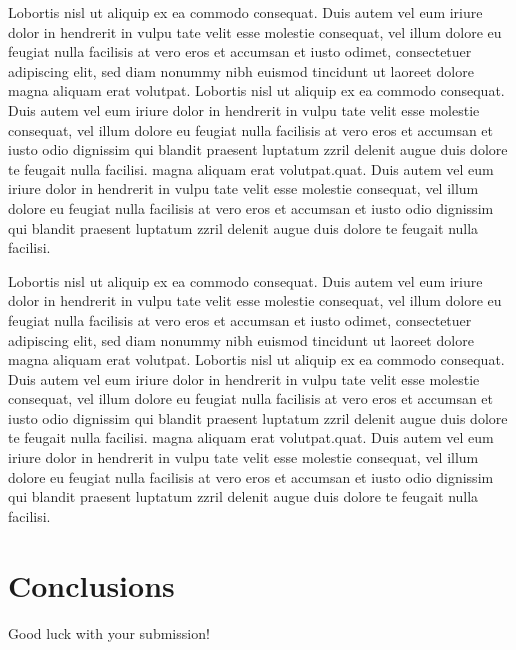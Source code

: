 \documentclass[a4paper, oneside, twocolumn, notitlepage, 10pt]{style/extarticle_ecoc2015}
\begin{document}
Lobortis nisl ut aliquip ex ea commodo consequat. Duis autem vel eum
iriure dolor in hendrerit in vulpu tate velit esse molestie
consequat, vel illum dolore eu feugiat nulla facilisis at vero eros
et accumsan et iusto odimet, consectetuer adipiscing elit, sed diam
nonummy nibh euismod tincidunt ut laoreet dolore magna aliquam erat
volutpat. Lobortis nisl ut aliquip ex ea commodo consequat. Duis
autem vel eum iriure dolor in hendrerit in vulpu tate velit esse
molestie consequat, vel illum dolore eu feugiat nulla facilisis at
vero eros et accumsan et iusto odio dignissim qui blandit praesent
luptatum zzril delenit augue duis dolore te feugait nulla facilisi.
magna aliquam erat volutpat.quat. Duis autem vel eum iriure dolor in
hendrerit in vulpu tate velit esse molestie consequat, vel illum
dolore eu feugiat nulla facilisis at vero eros et accumsan et iusto
odio dignissim qui blandit praesent luptatum zzril delenit augue
duis dolore te feugait nulla facilisi.

Lobortis nisl ut aliquip ex ea commodo consequat. Duis autem vel eum
iriure dolor in hendrerit in vulpu tate velit esse molestie
consequat, vel illum dolore eu feugiat nulla facilisis at vero eros
et accumsan et iusto odimet, consectetuer adipiscing elit, sed diam
nonummy nibh euismod tincidunt ut laoreet dolore magna aliquam erat
volutpat. Lobortis nisl ut aliquip ex ea commodo consequat. Duis
autem vel eum iriure dolor in hendrerit in vulpu tate velit esse
molestie consequat, vel illum dolore eu feugiat nulla facilisis at
vero eros et accumsan et iusto odio dignissim qui blandit praesent
luptatum zzril delenit augue duis dolore te feugait nulla facilisi.
magna aliquam erat volutpat.quat. Duis autem vel eum iriure dolor in
hendrerit in vulpu tate velit esse molestie consequat, vel illum
dolore eu feugiat nulla facilisis at vero eros et accumsan et iusto
odio dignissim qui blandit praesent luptatum zzril delenit augue
duis dolore te feugait nulla facilisi.


\section{Conclusions}

Good luck with your submission!

\end{document}
